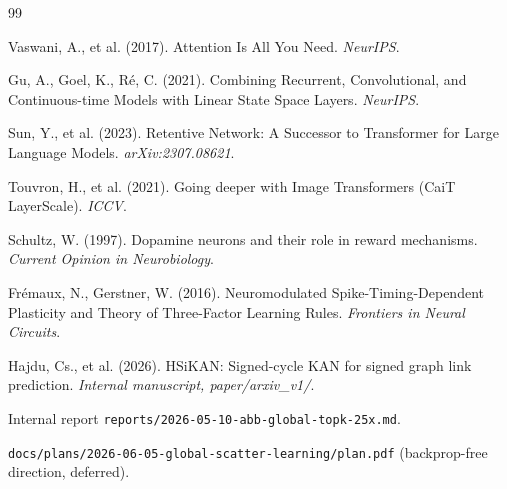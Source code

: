 \documentclass[10pt,a4paper]{article}
\begin{document}

\begin{thebibliography}{99}

Vaswani, A., et al. (2017). Attention Is All You Need. \emph{NeurIPS}.

Gu, A., Goel, K., R{\'e}, C. (2021). Combining Recurrent, Convolutional,
and Continuous-time Models with Linear State Space Layers. \emph{NeurIPS}.

Sun, Y., et al. (2023). Retentive Network: A Successor to Transformer
for Large Language Models. \emph{arXiv:2307.08621}.

Touvron, H., et al. (2021). Going deeper with Image Transformers (CaiT
LayerScale). \emph{ICCV}.

Schultz, W. (1997). Dopamine neurons and their role in reward
mechanisms. \emph{Current Opinion in Neurobiology}.

Fr{\'e}maux, N., Gerstner, W. (2016). Neuromodulated Spike-Timing-Dependent
Plasticity and Theory of Three-Factor Learning Rules.
\emph{Frontiers in Neural Circuits}.

Hajdu, Cs., et al. (2026). HSiKAN: Signed-cycle KAN for signed graph
link prediction. \emph{Internal manuscript, paper/arxiv\_v1/}.

Internal report \texttt{reports/2026-05-10-abb-global-topk-25x.md}.

\texttt{docs/plans/2026-06-05-global-scatter-learning/plan.pdf}
(backprop-free direction, deferred).

\end{thebibliography}
\end{document}
